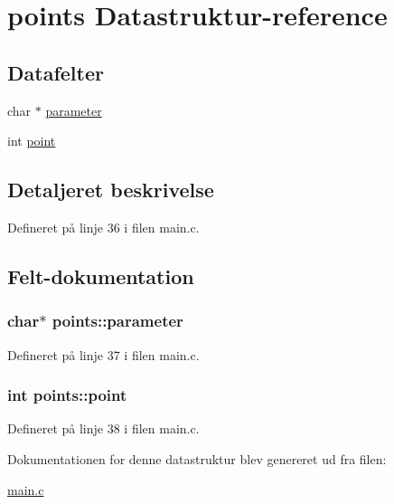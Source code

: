 \hypertarget{structpoints}{\section{points Datastruktur-\/reference}
\label{structpoints}
}
\subsection*{Datafelter}
\begin{DoxyCompactItemize}
\item 
char $\ast$ \hyperlink{structpoints_a006c88452ba4166f7aecf4e7c6d13cb7}{parameter}
\item 
int \hyperlink{structpoints_a41c32110b6e598eefc21bf4d775aec85}{point}
\end{DoxyCompactItemize}


\subsection{Detaljeret beskrivelse}


Defineret på linje 36 i filen main.\+c.



\subsection{Felt-\/dokumentation}
\hypertarget{structpoints_a006c88452ba4166f7aecf4e7c6d13cb7}{
\subsubsection[{parameter}]{\setlength{\rightskip}{0pt plus 5cm}char$\ast$ points\+::parameter}}\label{structpoints_a006c88452ba4166f7aecf4e7c6d13cb7}


Defineret på linje 37 i filen main.\+c.

\hypertarget{structpoints_a41c32110b6e598eefc21bf4d775aec85}{
\subsubsection[{point}]{\setlength{\rightskip}{0pt plus 5cm}int points\+::point}}\label{structpoints_a41c32110b6e598eefc21bf4d775aec85}


Defineret på linje 38 i filen main.\+c.



Dokumentationen for denne datastruktur blev genereret ud fra filen\+:\begin{DoxyCompactItemize}
\item 
\hyperlink{main_8c}{main.\+c}\end{DoxyCompactItemize}
